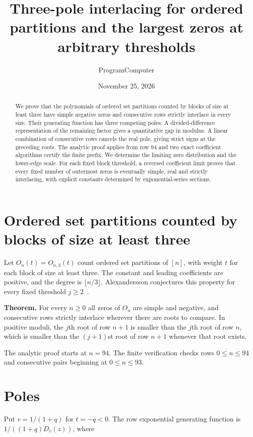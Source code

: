 \documentclass[11pt]{article}
\title{Three-pole interlacing for ordered partitions and the largest zeros at arbitrary thresholds}
\author{ProgramComputer}
\date{November 25, 2026}
\begin{document}
\maketitle
\begin{abstract}
We prove that the polynomials of ordered set partitions counted by blocks of size at least three have simple negative zeros and consecutive rows strictly interlace in every size. Their generating function has three competing poles. A divided-difference representation of the remaining factor gives a quantitative gap in modulus. A linear combination of consecutive rows cancels the real pole, giving strict signs at the preceding roots. The analytic proof applies from row 94 and two exact coefficient algorithms certify the finite prefix. We determine the limiting zero distribution and the lower-edge scale. For each fixed block threshold, a reversed coefficient limit proves that every fixed number of outermost zeros is eventually simple, real and strictly interlacing, with explicit constants determined by exponential-series sections.
\end{abstract}
\section{Ordered set partitions counted by blocks of size at least three}

Let $O_n(t)=O_{n,3}(t)$ count ordered set partitions of $[n]$, with weight $t$ for each block of size at least three. The constant and leading coefficients are positive, and the degree is $\lfloor n/3\rfloor$. Alexandersson conjectures this property for every fixed threshold $j\ge2$~\cite{original}.

\textbf{Theorem.} For every $n\ge0$ all zeros of $O_n$ are simple and negative, and consecutive rows strictly interlace wherever there are roots to compare. In positive moduli, the $j$th root of row $n+1$ is smaller than the $j$th root of row $n$, which is smaller than the $(j+1)$st root of row $n+1$ whenever that root exists.

The analytic proof starts at $n=94$. The finite verification checks rows $0\le n\le94$ and consecutive pairs beginning at $0\le n\le93$.

\section{Poles}

Put $v=1/(1+q)$ for $t=-q<0$. The row exponential generating function is $1/((1+q)D_v(z))$, where
\end{document}
